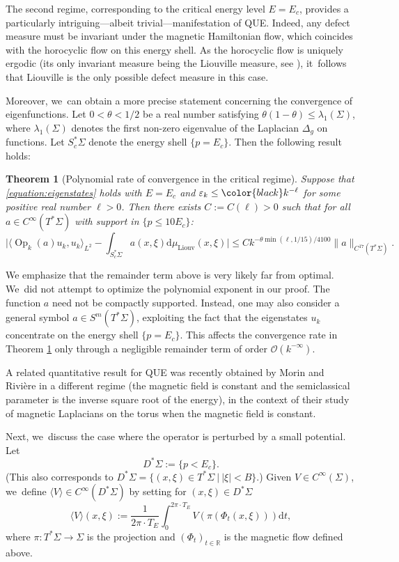 \documentclass[JEP,XML,SOM,Unicode,published]{cedram}
\theoremstyle{plain}
\newtheorem{theorem}{Theorem}[section]
\theoremstyle{definition}
\let\mc\mathcal
\newcommand{\R}{\mathbb{R}}
\let\eps\varepsilon
\newcommand{\dd}{\mathrm{d}}
\DeclareMathOperator{\Op}{Op}
\begin{document}
The second regime, corresponding to the critical energy level $E = E_c$, provides a particularly intriguing—albeit trivial—manifestation of QUE. Indeed, any defect measure must be invariant under the magnetic Hamiltonian flow, which coincides with the horocyclic flow on this energy shell. As the horocyclic flow is uniquely ergodic (its only invariant measure being the Liouville measure, see \cite{Furstenberg-73}), it~follows that Liouville is the only possible defect measure in this case.

Moreover, we~can obtain a more precise statement concerning the convergence of eigenfunctions. Let $0 < \theta < 1/2$ be a real number satisfying $\theta(1-\theta) \leq \lambda_1(\Sigma)$, where $\lambda_1(\Sigma)$ denotes the first non-zero eigenvalue of the Laplacian $\Delta_g$ on functions. Let $S^*_c\Sigma$ denote the energy shell $\{p=E_c\}$. Then the following result holds:

\begin{theorem}[Polynomial rate of convergence in the critical regime]
\label{theorem:horocyclic}
Suppose that \eqref{equation:eigenstates} holds with $E=E_c$ and $\eps_k \leq {\color{black}k^{-\ell}}$ for some {\color{black}positive real number} $\ell > 0$. Then there exists $C := C(\ell) > 0$ such that for all $a \in C^\infty(T^*\Sigma)$ with support in $\{p \leq 10E_c\}$:
\[
\biggl|\langle \Op_k(a) u_k,u_k\rangle_{L^2} - \int_{S^*_c\Sigma} a(x,\xi) \dd \mu_{\mathrm{Liouv}}(x,\xi)\biggr| \leq Ck^{-\theta \min(\ell,1/15)/4100}\|a\|_{C^{17}(T^*\Sigma)}.
\]
\end{theorem}

We emphasize that the remainder term above is very likely far from optimal. We~did not attempt to optimize the polynomial exponent in our proof. The function $a$ need not be compactly supported. Instead, one may also consider a general symbol $a \in S^m(T^*\Sigma)$, exploiting the fact that the eigenstates $u_k$ concentrate on the energy shell $\{p=E_c\}$. This affects the convergence rate in Theorem \ref{theorem:horocyclic} only through a negligible remainder term of order $\mc{O}(k^{-\infty})$.

A related quantitative result for QUE was recently obtained by Morin and Rivière \cite{Morin-Riviere-24} in a different regime (the magnetic field is constant and the semiclassical parameter is the inverse square root of the energy), in the context of their study of magnetic Laplacians on the torus when the magnetic field is constant.

Next, we~discuss the case where the operator is perturbed by a small potential. Let
\[
D^*\Sigma := \{p < E_c\}.
\]
(This also corresponds to $D^*\Sigma= \{(x,\xi) \in T^*\Sigma ~|~ |\xi| < B\}$.) Given $V \in C^\infty(\Sigma)$, we~define $\langle V \rangle \in C^\infty(D^*\Sigma)$ by setting for $(x,\xi) \in D^*\Sigma$
\[
\langle V \rangle(x,\xi) := \dfrac{1}{2\pi \cdot T_E} \int_0^{2\pi \cdot T_E} V(\pi(\Phi_t(x,\xi))) \dd t,
\]
where $\pi : T^*\Sigma \to \Sigma$ is the projection and $(\Phi_t)_{t \in \R}$ is the magnetic flow defined above.
\end{document}
